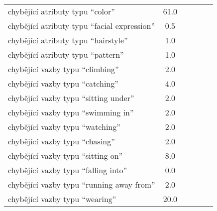 \begin{table}[ht!]
\begin{tabular}{|l|c|c|c|c|c|}
		chybějící atributy typu \enquote{color}             & 61.0                                        &            &            &            &            \\
		chybějící atributy typu \enquote{facial expression} & 0.5                                         &            &            &            &            \\
		chybějící atributy typu \enquote{hairstyle}         & 1.0                                         &            &            &            &            \\
		chybějící atributy typu \enquote{pattern}           & 1.0                                         &            &            &            &            \\
		\hline
		chybějící vazby typu \enquote{climbing}             & 2.0                                         &            &            &            &            \\
		chybějící vazby typu \enquote{catching}             & 4.0                                         &            &            &            &            \\
		chybějící vazby typu \enquote{sitting under}        & 2.0                                         &            &            &            &            \\
		chybějící vazby typu \enquote{swimming in}          & 2.0                                         &            &            &            &            \\
		chybějící vazby typu \enquote{watching}             & 2.0                                         &            &            &            &            \\
		chybějící vazby typu \enquote{chasing}              & 2.0                                         &            &            &            &            \\
		chybějící vazby typu \enquote{sitting on}           & 8.0                                         &            &            &            &            \\
		chybějící vazby typu \enquote{falling into}         & 0.0                                         &            &            &            &            \\
		chybějící vazby typu \enquote{running away from}    & 2.0                                         &            &            &            &            \\
		chybějící vazby typu \enquote{wearing}              & 20.0                                        &            &            &            &            \\

\end{tabular}
\end{table}
